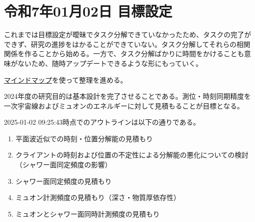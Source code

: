 
\section{令和7年01月02日 目標設定}

これまでは目標設定が曖昧でタスク分解できていなかったため、タスクの完了ができず、研究の進捗をはかることができていない。タスク分解してそれらの相関関係を作ることから始める。一方で、タスク分解ばかりに時間をかけることも意味がないため、随時アップデートできるような形にもっていく。

\href{https://xmind.ai/share/Cftre3Ed}{マインドマップ}を使って整理を進める。

2024年度の研究目的は基本設計を完了させることである。測位・時刻同期精度を一次宇宙線およびミュオンのエネルギーに対して見積もることが目標となる。

2025-01-02 09:25:43時点でのアウトラインは以下の通りである。

\begin{enumerate}
   \item 平面波近似での時刻・位置分解能の見積もり
   \item クライアントの時刻および位置の不定性による分解能の悪化についての検討（シャワー面同定頻度の影響）
   \item シャワー面同定頻度の見積もり
   \item ミュオン計測頻度の見積もり（深さ・物質厚依存性）
   \item ミュオンとシャワー面同時計測頻度の見積もり
\end{enumerate}